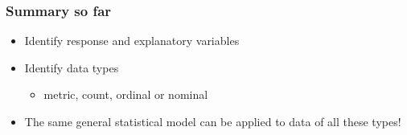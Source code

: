 \documentclass{beamer}
\begin{document}
\begin{frame}
  \frametitle{Summary so far}
  \begin{block}{}
      \begin{itemize}
        \item Identify response and explanatory variables
        \item Identify data types
        \begin{itemize}
          \item metric, count, ordinal or nominal
        \end{itemize}
        \item The same general statistical model can be applied to data of all these types!
      \end{itemize}
  \end{block}
\end{frame}
\end{document}
